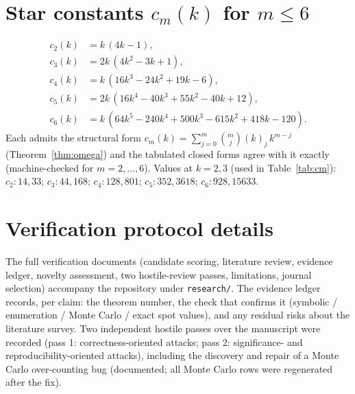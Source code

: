 \documentclass[11pt,a4paper]{article}
\theoremstyle{definition}
\theoremstyle{definition}
\begin{document}
\section{Star constants $c_m(k)$ for $m\le6$}\label{app:cm}
\[
\begin{aligned}
c_2(k) &= k\,(4k-1),\\
c_3(k) &= 2k\,(4k^{2}-3k+1),\\
c_4(k) &= k\,(16k^{3}-24k^{2}+19k-6),\\
c_5(k) &= 2k\,(16k^{4}-40k^{3}+55k^{2}-40k+12),\\
c_6(k) &= k\,(64k^{5}-240k^{4}+500k^{3}-615k^{2}+418k-120).
\end{aligned}
\]
Each admits the structural form
$c_m(k)=\sum_{j=0}^{m}\binom{m}{j}(k)_j\,k^{m-j}$
(Theorem~\ref{thm:omega}) and the tabulated closed forms agree with it exactly
(machine-checked for $m=2,\dots,6$). Values at $k=2,3$ (used in
Table~\ref{tab:cm}): $c_2: 14, 33$; $c_3: 44, 168$; $c_4: 128, 801$;
$c_5: 352, 3618$; $c_6: 928, 15633$.

\section{Verification protocol details}\label{app:verify}
The full verification documents (candidate scoring, literature review, evidence
ledger, novelty assessment, two hostile-review passes, limitations, journal
selection) accompany the repository under \texttt{research/}. The evidence ledger
records, per claim: the theorem number, the check that confirms it (symbolic /
enumeration / Monte Carlo / exact spot values), and any residual risks about the
literature survey. Two independent hostile passes over the manuscript were
recorded (pass 1: correctness-oriented attacks; pass 2: significance- and
reproducibility-oriented attacks), including the discovery and repair of a Monte
Carlo over-counting bug (documented; all Monte Carlo rows were regenerated after
the fix).
\end{document}
